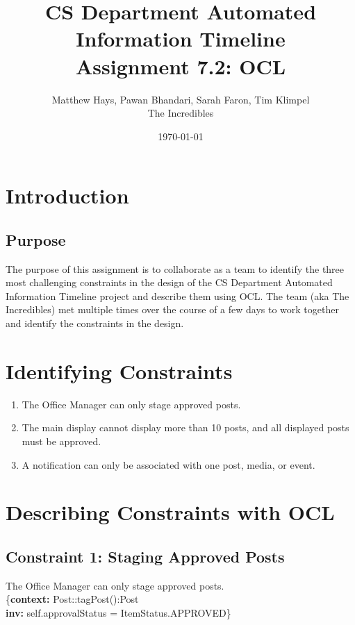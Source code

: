 \documentclass{article}
\title{CS Department Automated Information Timeline \\ Assignment 7.2: OCL}
\date{\today}
\author{Matthew Hays, Pawan Bhandari, Sarah Faron, Tim Klimpel \\ The Incredibles}
\begin{document}
\maketitle
\newpage
\tableofcontents
\listoffigures
\newpage
\section{Introduction}
\subsection{Purpose}
The purpose of this assignment is to collaborate as a team to identify the three most challenging constraints in the design of the CS Department Automated Information Timeline project and describe them using OCL. The team (aka The Incredibles) met multiple times over the course of a few days to work together and identify the constraints in the design.

\section{Identifying Constraints}
\begin{enumerate}
    \item The Office Manager can only stage approved posts.
    \item The main display cannot display more than 10 posts, and all displayed posts must be approved.
    \item A notification can only be associated with one post, media, or event.
\end{enumerate}

\section{Describing Constraints with OCL}

\subsection{Constraint 1: Staging Approved Posts}

The Office Manager can only stage approved posts. \\

\{\textbf{context:} Post::tagPost():Post \\
\textbf{inv:} self.approvalStatus = ItemStatus.APPROVED\} \\
\end{document}
